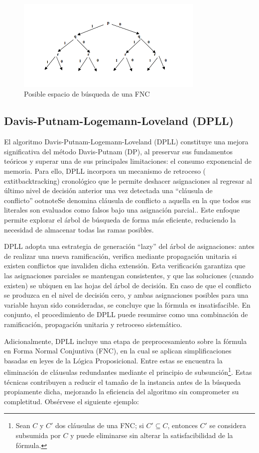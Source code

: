 \begin{figure}[ht]
    \centering
    \includegraphics[width=0.8\textwidth]{Graphics/arboldp.png}
    \caption{Posible espacio de b\'usqueda de una FNC}
    \label{fig:arbol DP}
\end{figure}

\subsection{Davis-Putnam-Logemann-Loveland (DPLL)}
El algoritmo Davis-Putnam-Logemann-Loveland (DPLL) constituye una mejora significativa del método Davis-Putnam (DP), al preservar sus fundamentos teóricos y superar una de sus principales limitaciones: el consumo exponencial de memoria. Para ello, DPLL incorpora un mecanismo de retroceso (	extit{backtracking}) cronológico que le permite deshacer asignaciones al regresar al último nivel de decisión anterior una vez detectada una “cláusula de conflicto”ootnote{Se denomina cláusula de conflicto a aquella en la que todos sus literales son evaluados como falsos bajo una asignación parcial.}. Este enfoque permite explorar el árbol de búsqueda de forma más eficiente, reduciendo la necesidad de almacenar todas las ramas posibles.

DPLL adopta una estrategia de generación “lazy” del árbol de asignaciones: antes de realizar una nueva ramificación, verifica mediante propagación unitaria si existen conflictos que invaliden dicha extensión. Esta verificación garantiza que las asignaciones parciales se mantengan consistentes, y que las soluciones (cuando existen) se ubiquen en las hojas del árbol de decisión. En caso de que el conflicto se produzca en el nivel de decisión cero, y ambas asignaciones posibles para una variable hayan sido consideradas, se concluye que la fórmula es insatisfacible. En conjunto, el procedimiento de DPLL puede resumirse como una combinación de ramificación, propagación unitaria y retroceso sistemático.

Adicionalmente, DPLL incluye una etapa de preprocesamiento sobre la f\'ormula en Forma Normal Conjuntiva (FNC), en la cual se aplican simplificaciones basadas en leyes de la L\'ogica Proposicional. Entre estas se encuentra la eliminaci\'on de cl\'ausulas redundantes mediante el principio de subsunci\'on\footnote{Sean $C$ y $C'$ dos cl\'ausulas de una FNC; si $C' \subseteq C$, entonces $C'$ se considera subsumida por $C$ y puede eliminarse sin alterar la satisfacibilidad de la f\'ormula.}. Estas t\'ecnicas contribuyen a reducir el tama\~no de la instancia antes de la b\'usqueda propiamente dicha, mejorando la eficiencia del algoritmo sin comprometer su completitud.
Obsérvese el siguiente ejemplo:

